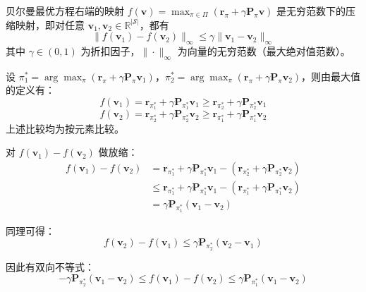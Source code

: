 \documentclass[UTF8]{article}
\begin{document}
\begin{theorembox}
    贝尔曼最优方程右端的映射 $f(\boldsymbol{v}) = \max_{\pi \in \Pi} (\boldsymbol{r}_\pi + \gamma \boldsymbol{P}_\pi \boldsymbol{v})$ 是无穷范数下的压缩映射，即对任意 $\boldsymbol{v}_1, \boldsymbol{v}_2 \in \mathbb{R}^{|\mathcal{S}|}$，都有
    \[
    \| f(\boldsymbol{v}_1) - f(\boldsymbol{v}_2) \|_\infty \leq \gamma \| \boldsymbol{v}_1 - \boldsymbol{v}_2 \|_\infty
    \]
    其中 $\gamma \in (0,1)$ 为折扣因子，$\|\cdot\|_\infty$ 为向量的无穷范数（最大绝对值范数）。
\end{theorembox}

\begin{proofbox}
    设 $\pi_1^* = \arg\max_\pi (\boldsymbol{r}_\pi + \gamma \boldsymbol{P}_\pi \boldsymbol{v}_1)$，$\pi_2^* = \arg\max_\pi (\boldsymbol{r}_\pi + \gamma \boldsymbol{P}_\pi \boldsymbol{v}_2)$，则由最大值的定义有：
    \[
    f(\boldsymbol{v}_1) = \boldsymbol{r}_{\pi_1^*} + \gamma \boldsymbol{P}_{\pi_1^*} \boldsymbol{v}_1 \geq \boldsymbol{r}_{\pi_2^*} + \gamma \boldsymbol{P}_{\pi_2^*} \boldsymbol{v}_1
    \]
    \[
    f(\boldsymbol{v}_2) = \boldsymbol{r}_{\pi_2^*} + \gamma \boldsymbol{P}_{\pi_2^*} \boldsymbol{v}_2 \geq \boldsymbol{r}_{\pi_1^*} + \gamma \boldsymbol{P}_{\pi_1^*} \boldsymbol{v}_2
    \]
    上述比较均为按元素比较。

    对 $f(\boldsymbol{v}_1) - f(\boldsymbol{v}_2)$ 做放缩：
    \[
    \begin{aligned}
    f(\boldsymbol{v}_1) - f(\boldsymbol{v}_2) &= \boldsymbol{r}_{\pi_1^*} + \gamma \boldsymbol{P}_{\pi_1^*} \boldsymbol{v}_1 - \left( \boldsymbol{r}_{\pi_2^*} + \gamma \boldsymbol{P}_{\pi_2^*} \boldsymbol{v}_2 \right) \\
    &\leq \boldsymbol{r}_{\pi_1^*} + \gamma \boldsymbol{P}_{\pi_1^*} \boldsymbol{v}_1 - \left( \boldsymbol{r}_{\pi_1^*} + \gamma \boldsymbol{P}_{\pi_1^*} \boldsymbol{v}_2 \right) \\
    &= \gamma \boldsymbol{P}_{\pi_1^*} (\boldsymbol{v}_1 - \boldsymbol{v}_2)
    \end{aligned}
    \]

    同理可得：
    \[
    f(\boldsymbol{v}_2) - f(\boldsymbol{v}_1) \leq \gamma \boldsymbol{P}_{\pi_2^*} (\boldsymbol{v}_2 - \boldsymbol{v}_1)
    \]

    因此有双向不等式：
    \[
    -\gamma \boldsymbol{P}_{\pi_2^*} (\boldsymbol{v}_1 - \boldsymbol{v}_2) \leq f(\boldsymbol{v}_1) - f(\boldsymbol{v}_2) \leq \gamma \boldsymbol{P}_{\pi_1^*} (\boldsymbol{v}_1 - \boldsymbol{v}_2)
    \]


\end{proofbox}
\end{document}
